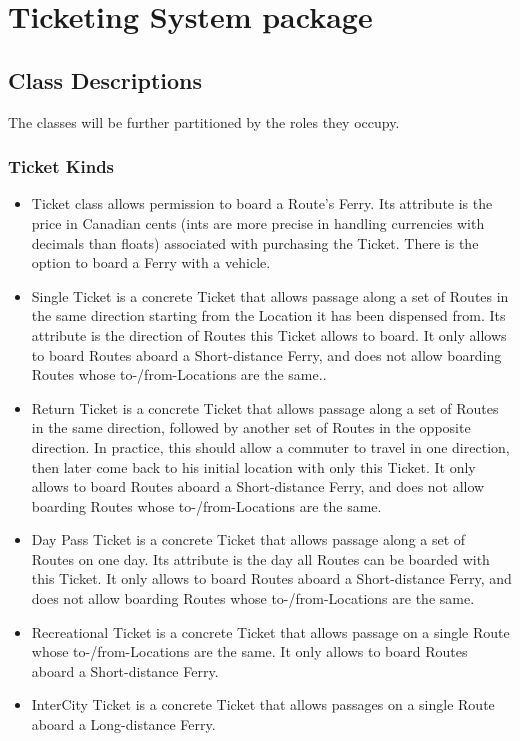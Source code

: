 \documentclass[letterpaper]{report}
\begin{document}
\section{Ticketing System package}
\subsection{Class Descriptions}
The classes will be further partitioned by the roles they occupy.
\subsubsection{Ticket Kinds}
\begin{itemize}
    \item Ticket class allows permission to board a Route’s Ferry. Its attribute is the price in Canadian cents (ints are more precise in handling currencies with decimals than floats) associated with purchasing the Ticket. There is the option to board a Ferry with a vehicle.
    \item Single Ticket is a concrete Ticket that allows passage along a set of Routes in the same direction starting from the Location it has been dispensed from. Its attribute is the direction of Routes this Ticket allows to board. It only allows to board Routes aboard a Short-distance Ferry, and does not allow boarding Routes whose to-/from-Locations are the same..
    \item Return Ticket is a concrete Ticket that allows passage along a set of Routes in the same direction, followed by another set of Routes in the opposite direction. In practice, this should allow a commuter to travel in one direction, then later come back to his initial location with only this Ticket. It only allows to board Routes aboard a Short-distance Ferry, and does not allow boarding Routes whose to-/from-Locations are the same.
    \item Day Pass Ticket is a concrete Ticket that allows passage along a set of Routes on one day. Its attribute is the day all Routes can be boarded with this Ticket. It only allows to board Routes aboard a Short-distance Ferry, and does not allow boarding Routes whose to-/from-Locations are the same.
    \item Recreational Ticket is a concrete Ticket that allows passage on a single Route whose to-/from-Locations are the same. It only allows to board Routes aboard a Short-distance Ferry.
    \item InterCity Ticket is a concrete Ticket that allows passages on a single Route aboard a Long-distance Ferry.
\end{itemize}
\end{document}
